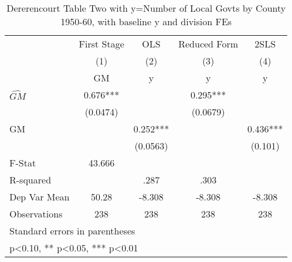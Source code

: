 \begin{table}[htbp]\centering
\def\sym#1{\ifmmode^{#1}\else\(^{#1}\)\fi}
\caption{Dererencourt Table Two with y=Number of Local Govts by County 1950-60, with baseline y and division FEs}
\begin{tabular}{l*{4}{c}}
\toprule
                    & First Stage   &         OLS   &Reduced Form   &        2SLS   \\
                    &\multicolumn{1}{c}{(1)}&\multicolumn{1}{c}{(2)}&\multicolumn{1}{c}{(3)}&\multicolumn{1}{c}{(4)}\\
                    &\multicolumn{1}{c}{GM}&\multicolumn{1}{c}{y}&\multicolumn{1}{c}{y}&\multicolumn{1}{c}{y}\\
\midrule
$\hat{GM}$          &       0.676***&               &       0.295***&               \\
                    &    (0.0474)   &               &    (0.0679)   &               \\
\addlinespace
GM                  &               &       0.252***&               &       0.436***\\
                    &               &    (0.0563)   &               &     (0.101)   \\
\midrule
F-Stat              &      43.666   &               &               &               \\
R-squared           &               &        .287   &        .303   &               \\
Dep Var Mean        &       50.28   &      -8.308   &      -8.308   &      -8.308   \\
Observations        &         238   &         238   &         238   &         238   \\
\bottomrule
\multicolumn{5}{l}{\footnotesize Standard errors in parentheses}\\
\multicolumn{5}{l}{\footnotesize * p<0.10, ** p<0.05, *** p<0.01}\\
\end{tabular}
\end{table}
